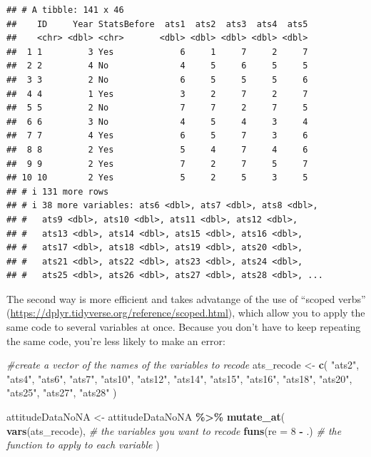 \documentclass[
  12pt,
]{book}
\newenvironment{Shaded}{\begin{snugshade}}{\end{snugshade}}
\newcommand{\AttributeTok}[1]{\textcolor[rgb]{0.13,0.29,0.53}{#1}}
\newcommand{\CommentTok}[1]{\textcolor[rgb]{0.56,0.35,0.01}{\textit{#1}}}
\newcommand{\DecValTok}[1]{\textcolor[rgb]{0.00,0.00,0.81}{#1}}
\newcommand{\FunctionTok}[1]{\textcolor[rgb]{0.13,0.29,0.53}{\textbf{#1}}}
\newcommand{\NormalTok}[1]{#1}
\newcommand{\OtherTok}[1]{\textcolor[rgb]{0.56,0.35,0.01}{#1}}
\newcommand{\SpecialCharTok}[1]{\textcolor[rgb]{0.81,0.36,0.00}{\textbf{#1}}}
\newcommand{\StringTok}[1]{\textcolor[rgb]{0.31,0.60,0.02}{#1}}
\begin{document}
\begin{verbatim}
## # A tibble: 141 x 46
##    ID     Year StatsBefore  ats1  ats2  ats3  ats4  ats5
##    <chr> <dbl> <chr>       <dbl> <dbl> <dbl> <dbl> <dbl>
##  1 1         3 Yes             6     1     7     2     7
##  2 2         4 No              4     5     6     5     5
##  3 3         2 No              6     5     5     5     6
##  4 4         1 Yes             3     2     7     2     7
##  5 5         2 No              7     7     2     7     5
##  6 6         3 No              4     5     4     3     4
##  7 7         4 Yes             6     5     7     3     6
##  8 8         2 Yes             5     4     7     4     6
##  9 9         2 Yes             7     2     7     5     7
## 10 10        2 Yes             5     2     5     3     5
## # i 131 more rows
## # i 38 more variables: ats6 <dbl>, ats7 <dbl>, ats8 <dbl>,
## #   ats9 <dbl>, ats10 <dbl>, ats11 <dbl>, ats12 <dbl>,
## #   ats13 <dbl>, ats14 <dbl>, ats15 <dbl>, ats16 <dbl>,
## #   ats17 <dbl>, ats18 <dbl>, ats19 <dbl>, ats20 <dbl>,
## #   ats21 <dbl>, ats22 <dbl>, ats23 <dbl>, ats24 <dbl>,
## #   ats25 <dbl>, ats26 <dbl>, ats27 <dbl>, ats28 <dbl>, ...
\end{verbatim}

The second way is more efficient and takes advatange of the use of ``scoped verbs'' (\url{https://dplyr.tidyverse.org/reference/scoped.html}), which allow you to apply the same code to several variables at once. Because you don't have to keep repeating the same code, you're less likely to make an error:

\begin{Shaded}
\begin{Highlighting}[]
\CommentTok{\#create a vector of the names of the variables to recode}
\NormalTok{ats\_recode }\OtherTok{\textless{}{-}} 
  \FunctionTok{c}\NormalTok{(}
    \StringTok{"ats2"}\NormalTok{,}
    \StringTok{"ats4"}\NormalTok{,}
    \StringTok{"ats6"}\NormalTok{,}
    \StringTok{"ats7"}\NormalTok{,}
    \StringTok{"ats10"}\NormalTok{,}
    \StringTok{"ats12"}\NormalTok{,}
    \StringTok{"ats14"}\NormalTok{,}
    \StringTok{"ats15"}\NormalTok{,}
    \StringTok{"ats16"}\NormalTok{,}
    \StringTok{"ats18"}\NormalTok{,}
    \StringTok{"ats20"}\NormalTok{,}
    \StringTok{"ats25"}\NormalTok{,}
    \StringTok{"ats27"}\NormalTok{,}
    \StringTok{"ats28"}
\NormalTok{  )}


\NormalTok{attitudeDataNoNA }\OtherTok{\textless{}{-}}
\NormalTok{  attitudeDataNoNA }\SpecialCharTok{\%\textgreater{}\%} 
  \FunctionTok{mutate\_at}\NormalTok{(}
    \FunctionTok{vars}\NormalTok{(ats\_recode), }\CommentTok{\# the variables you want to recode}
    \FunctionTok{funs}\NormalTok{(}\AttributeTok{re =} \DecValTok{8} \SpecialCharTok{{-}}\NormalTok{ .) }\CommentTok{\# the function to apply to each variable}
\NormalTok{  )}
\end{Highlighting}
\end{Shaded}
\end{document}
